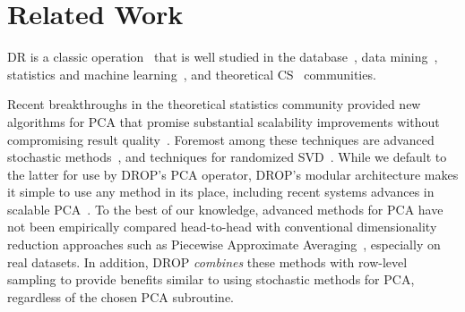 \section{Related Work}
\label{sec:relwork}
\label{sec:relatedwork}

 DR is a
classic operation~\cite{dr-survey1,dr-survey2,trefethen,nonlinear-dr} that is
well studied in the
database~\cite{keogh-indexing,local-dr,charu-ss,dynamic-ss}, data
mining~\cite{sax,paa}, statistics and machine
learning~\cite{alecton,shamir}, and theoretical CS~\cite{bernstein,pca-stoc} communities.

Recent breakthroughs in the theoretical
statistics community provided new algorithms for PCA that promise
substantial scalability improvements without compromising result
quality~\cite{alecton,bernstein,tropp,lowrank,re-new}. 
Foremost among these techniques are advanced stochastic methods~\cite{re-new,shamir}, and techniques for randomized SVD~\cite{tropp}.
While we default to the latter for use by DROP's PCA operator, DROP's modular architecture makes it simple to use any method in its place, including recent systems advances in scalable PCA~\cite{ppca-sigmod}.
To the best of our knowledge, advanced methods for PCA
have not been empirically compared head-to-head with conventional
dimensionality reduction approaches such as Piecewise Approximate
Averaging~\cite{paa}, especially on real datasets. 
In addition, DROP
\emph{combines} these methods with row-level sampling to provide benefits similar to using stochastic methods for PCA, regardless of the chosen PCA subroutine. 




